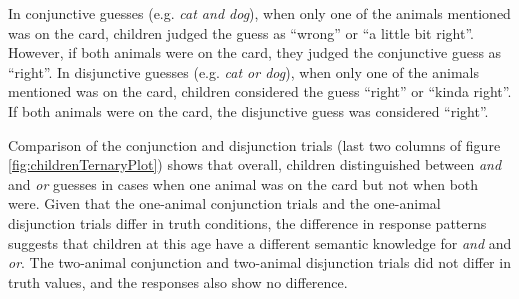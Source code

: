 \documentclass[oneside]{report}
\theoremstyle{definition}
\theoremstyle{definition}
\theoremstyle{definition}
\theoremstyle{remark}
\begin{document}
In conjunctive guesses (e.g. \emph{cat and dog}), when only one of the
animals mentioned was on the card, children judged the guess as
``wrong'' or ``a little bit right''. However, if both animals were on
the card, they judged the conjunctive guess as ``right''. In disjunctive
guesses (e.g. \emph{cat or dog}), when only one of the animals mentioned
was on the card, children considered the guess ``right'' or ``kinda
right''. If both animals were on the card, the disjunctive guess was
considered ``right''.

Comparison of the conjunction and disjunction trials (last two columns
of figure \ref{fig:childrenTernaryPlot}) shows that overall, children
distinguished between \emph{and} and \emph{or} guesses in cases when one
animal was on the card but not when both were. Given that the one-animal
conjunction trials and the one-animal disjunction trials differ in truth
conditions, the difference in response patterns suggests that children
at this age have a different semantic knowledge for \emph{and} and
\emph{or}. The two-animal conjunction and two-animal disjunction trials
did not differ in truth values, and the responses also show no
difference.
\end{document}
